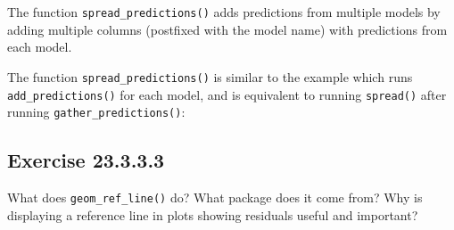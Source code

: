 \documentclass[]{book}
\newenvironment{Shaded}{\begin{snugshade}}{\end{snugshade}}
\newcommand{\CommentTok}[1]{\textcolor[rgb]{0.56,0.35,0.01}{\textit{#1}}}
\newcommand{\KeywordTok}[1]{\textcolor[rgb]{0.13,0.29,0.53}{\textbf{#1}}}
\newcommand{\NormalTok}[1]{#1}
\newcommand{\OperatorTok}[1]{\textcolor[rgb]{0.81,0.36,0.00}{\textbf{#1}}}
\newcommand{\StringTok}[1]{\textcolor[rgb]{0.31,0.60,0.02}{#1}}
\theoremstyle{plain}
\theoremstyle{remark}
\begin{document}
The function \texttt{spread\_predictions()} adds predictions from
multiple models by adding multiple columns (postfixed with the model
name) with predictions from each model.

\begin{Shaded}
\end{Shaded}

The function \texttt{spread\_predictions()} is similar to the example
which runs \texttt{add\_predictions()} for each model, and is equivalent
to running \texttt{spread()} after running
\texttt{gather\_predictions()}:

\begin{Shaded}
\end{Shaded}

\hypertarget{exercise-23.3.3.3}{%
\subsection*{\texorpdfstring{Exercise
{23.3.3.3}}{Exercise 23.3.3.3}}\label{exercise-23.3.3.3}}

What does \texttt{geom\_ref\_line()} do? What package does it come from?
Why is displaying a reference line in plots showing residuals useful and
important?
\end{document}
